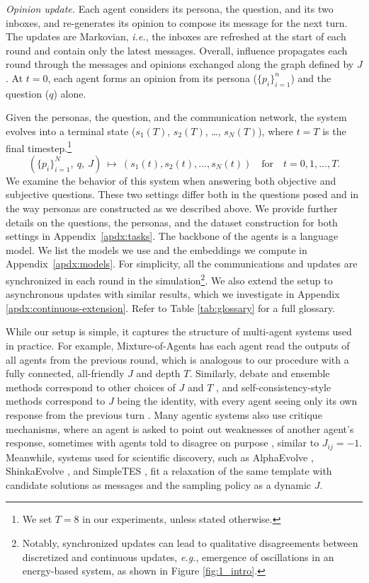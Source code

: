 \textit{Opinion update.} Each agent considers its persona, the question, and its two inboxes, and re-generates its opinion to compose its message for the next turn. The updates are Markovian, \textit{i.e.},  the inboxes are refreshed at the start of each round and contain only the latest messages. Overall, influence propagates each round through the messages and opinions exchanged along the graph defined by
$J$. At $t=0$, each agent forms an opinion from its persona ($\{p_i\}_{i=1}^n$) and the question ($q$) alone.

Given the personas, the question, and the communication network, the system evolves into a terminal state ($s_1(T)$,  $s_2(T)$, \dots, $s_N(T)$), where $t=T$ is the final timestep.\footnote{We set $T=8$ in our experiments, unless stated otherwise.}
$$
(\{p_i\}_{i=1}^N,\ q,\ J)\ \longmapsto\ (s_1(t),  s_2(t), \dots, s_N(t)) \quad \text{for} \quad t = 0,1,\dots,T.
$$
We examine the behavior of this system when answering both objective and subjective questions. These two settings differ both in the questions posed and in the way personas are constructed as we described above. We provide further details on the questions, the personas, and the dataset construction for both settings in Appendix~\ref{apdx:tasks}. The backbone of the agents is a language model. We list the models we use and the embeddings we compute in Appendix~\ref{apdx:models}. For simplicity, all the communications and updates are synchronized in each round in the simulation\footnote{Notably, synchronized updates can lead to qualitative disagreements between discretized and continuous updates, \textit{e.g.}, emergence of oscillations in an energy-based system, as shown in Figure \ref{fig:1_intro}.}. We also extend the setup to asynchronous updates with similar results, which we investigate in Appendix \ref{apdx:continuous-extension}. Refer to Table \ref{tab:glossary} for a full glossary.

While our setup is simple, it captures the structure of multi-agent systems used in practice. For example, Mixture-of-Agents \citep{wang2024mixtureofagentsenhanceslargelanguage} has each agent read the outputs of all agents from the previous round, which is analogous to our procedure with a fully connected, all-friendly $J$ and depth $T$. Similarly, debate and ensemble methods correspond to other choices of $J$ and $T$ \citep{Swanson2024.11.11.623004,  du2023improvingfactualityreasoninglanguage}, and self-consistency-style methods correspond to $J$ being the identity, with every agent seeing only its own response from the previous turn \citep{wang2023selfconsistencyimproveschainthought}. Many agentic systems also use critique mechanisms, where an agent is asked to point out weaknesses of another agent's response, sometimes with agents told to disagree on purpose \citep{liang-etal-2024-encouraging}, similar to $J_{ij} = -1$. Meanwhile, systems used for scientific discovery, such as AlphaEvolve \citep{novikov2025alphaevolvecodingagentscientific}, ShinkaEvolve \citep{lange2025shinkaevolveopenendedsampleefficientprogram}, and SimpleTES \citep{ye2026structuredscalingaidiscovery}, fit a relaxation of the same template with candidate solutions as messages and the sampling policy as a dynamic $J$. 
